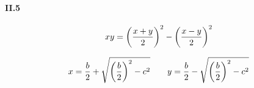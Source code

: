 \documentclass [12pt]{article}
\begin{document}
\paragraph{II.5}

$$xy=\left(x+y\over2\right)^2-\left(x-y\over2\right)^2$$

$$x={b\over2}+\sqrt{\left(b\over2\right)^2-c^2}\qquad
y={b\over2}-\sqrt{\left(b\over2\right)^2-c^2}$$
\end{document}
